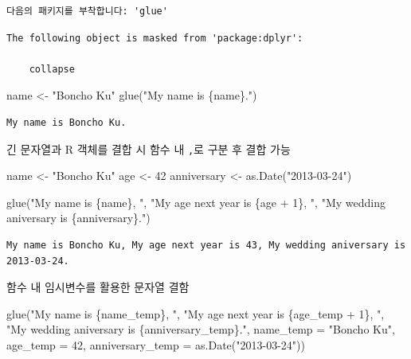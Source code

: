 \documentclass[
  11pt,
]{krantz}
\newenvironment{Shaded}{\begin{snugshade}}{\end{snugshade}}
\newcommand{\AttributeTok}[1]{\textcolor[rgb]{0.61,0.61,0.61}{#1}}
\newcommand{\DecValTok}[1]{\textcolor[rgb]{0.06,0.06,0.06}{#1}}
\newcommand{\FunctionTok}[1]{\textcolor[rgb]{0,0,0}{#1}}
\newcommand{\NormalTok}[1]{#1}
\newcommand{\OtherTok}[1]{\textcolor[rgb]{0.37,0.37,0.37}{#1}}
\newcommand{\StringTok}[1]{\textcolor[rgb]{0.5,0.5,0.5}{#1}}
\begin{document}
\begin{verbatim}
다음의 패키지를 부착합니다: 'glue'
\end{verbatim}

\begin{verbatim}
The following object is masked from 'package:dplyr':

    collapse
\end{verbatim}

\begin{Shaded}
\begin{Highlighting}[]
\NormalTok{name }\OtherTok{\textless{}{-}} \StringTok{"Boncho Ku"}
\FunctionTok{glue}\NormalTok{(}\StringTok{"My name is \{name\}."}\NormalTok{)}
\end{Highlighting}
\end{Shaded}

\begin{verbatim}
My name is Boncho Ku.
\end{verbatim}

\normalsize

긴 문자열과 R 객체를 결합 시 함수 내 \texttt{,}로 구분 후 결합 가능

\footnotesize

\begin{Shaded}
\begin{Highlighting}[]
\NormalTok{name }\OtherTok{\textless{}{-}} \StringTok{"Boncho Ku"}
\NormalTok{age }\OtherTok{\textless{}{-}} \DecValTok{42}
\NormalTok{anniversary }\OtherTok{\textless{}{-}} \FunctionTok{as.Date}\NormalTok{(}\StringTok{"2013{-}03{-}24"}\NormalTok{)}

\FunctionTok{glue}\NormalTok{(}\StringTok{"My name is \{name\}, "}\NormalTok{, }
     \StringTok{"My age next year is \{age + 1\}, "}\NormalTok{, }
     \StringTok{"My wedding aniversary is \{anniversary\}."}\NormalTok{)}
\end{Highlighting}
\end{Shaded}

\begin{verbatim}
My name is Boncho Ku, My age next year is 43, My wedding aniversary is 2013-03-24.
\end{verbatim}

\normalsize

함수 내 임시변수를 활용한 문자열 결함

\footnotesize

\begin{Shaded}
\begin{Highlighting}[]
\FunctionTok{glue}\NormalTok{(}\StringTok{"My name is \{name\_temp\}, "}\NormalTok{, }
     \StringTok{"My age next year is \{age\_temp + 1\}, "}\NormalTok{, }
     \StringTok{"My wedding aniversary is \{anniversary\_temp\}."}\NormalTok{, }
     \AttributeTok{name\_temp =} \StringTok{"Boncho Ku"}\NormalTok{, }
     \AttributeTok{age\_temp =} \DecValTok{42}\NormalTok{, }
     \AttributeTok{anniversary\_temp =} \FunctionTok{as.Date}\NormalTok{(}\StringTok{"2013{-}03{-}24"}\NormalTok{))}
\end{Highlighting}
\end{Shaded}
\end{document}
